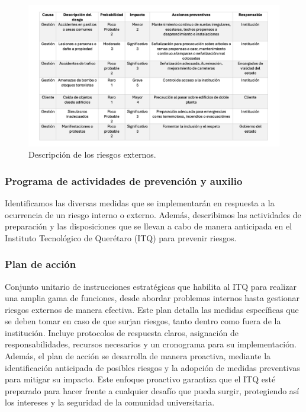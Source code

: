     \begin{figure}[H]
        \centering
        \includegraphics[scale=0.17]{15/img/talaRiesgosExternos.pdf}
        \caption{Descripción de los riesgos externos.}
        \label{fig:tablaRiesgosExternos}
    \end{figure}
    
    \subsubsection{Programa de actividades de prevención y auxilio}
    Identificamos las diversas medidas que se implementarán en respuesta a la ocurrencia de un riesgo interno o externo. Además, describimos las actividades de preparación y las disposiciones que se llevan a cabo de manera anticipada en el Instituto Tecnológico de Querétaro (ITQ) para prevenir riesgos.
    \subsubsection{Plan de acción}
    Conjunto unitario de instrucciones estratégicas que habilita al ITQ para realizar una amplia gama de funciones, desde abordar problemas internos hasta gestionar riesgos externos de manera efectiva. Este plan detalla las medidas específicas que se deben tomar en caso de que surjan riesgos, tanto dentro como fuera de la institución. Incluye protocolos de respuesta claros, asignación de responsabilidades, recursos necesarios y un cronograma para su implementación. Además, el plan de acción se desarrolla de manera proactiva, mediante la identificación anticipada de posibles riesgos y la adopción de medidas preventivas para mitigar su impacto. Este enfoque proactivo garantiza que el ITQ esté preparado para hacer frente a cualquier desafío que pueda surgir, protegiendo así los intereses y la seguridad de la comunidad universitaria.
    
